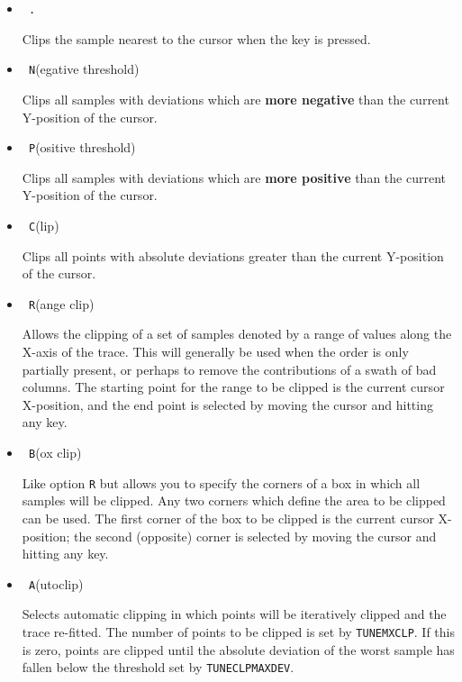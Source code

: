 \documentclass[twoside,11pt]{article}
\newcommand{\xlabel}[1]{}
\renewcommand{\_}{\texttt{\symbol{95}}}
\newcommand{\mlabel}[1]{\xlabel{#1}\label{#1}}
\newcommand{\sunspec}[2]{#1}
\newcommand{\sunspec}[2]{#2}
\begin{document}
\mlabel{clip_menu}
\begin{itemize}

\item {\sunspec{\Large\tt}{\bf} .}

     Clips the sample nearest to the cursor when the key is pressed.

\item {\sunspec{\Large\tt}{\bf} N}(egative threshold)

     Clips all samples with deviations which are
     {\bf more negative} than the current Y-position of the cursor.

\item {\sunspec{\Large\tt}{\bf} P}(ositive threshold)

     Clips all samples with deviations which are
     {\bf more positive} than the current Y-position of the cursor.


\item {\sunspec{\Large\tt}{\bf} C}(lip)

     Clips all points with absolute deviations greater than the current
     Y-position of the cursor.

\item {\sunspec{\Large\tt}{\bf} R}(ange clip)

     Allows the clipping of a set of samples denoted by a range
     of values along the X-axis of the trace. This will generally be used
     when the order is only partially present, or perhaps to remove
     the contributions of a swath of bad columns. The starting point for
     the range to be clipped is the current cursor X-position, and the
     end point is selected by moving the cursor and hitting any key.

\item {\sunspec{\Large\tt}{\bf} B}(ox clip)

     Like option \texttt{R} but allows you to specify the corners of
     a box in which all samples will be clipped.  Any two corners
     which define the area to be clipped can be used.
     The first corner of the box to be clipped is the current
     cursor X-position; the second (opposite) corner
     is selected by moving the cursor and hitting any key.

\item {\sunspec{\Large\tt}{\bf} A}(utoclip)

     Selects automatic clipping in which points will be
     iteratively clipped and the trace re-fitted. The number of points
     to be clipped is set by {\tt TUNE\_MXCLP}.  If this is zero,
     points are clipped until the absolute deviation of the worst
     sample has fallen below the threshold set by {\tt TUNE\_CLPMAXDEV}.



\end{itemize}
\end{document}
